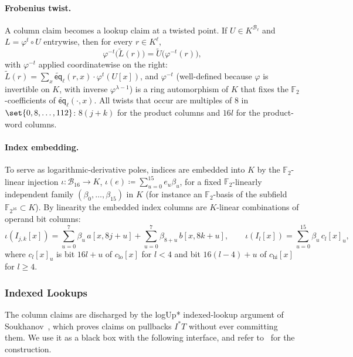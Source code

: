 \documentclass{article}
\theoremstyle{definition}
\newcommand*{\mle}{\widetilde}
\newcommand{\eq}{\mathsf{eq}}
\newcommand{\BB}{\mathcal{B}}
\newcommand{\FF}[1]{\mathbb{F}_{#1}}
\begin{document}
\paragraph{Frobenius twist.}
A column claim becomes a lookup claim at a twisted point. If $U \in K^{\BB_\ell}$ and $L = \varphi^t \circ U$ entrywise, then for every $r \in K^\ell$,
\begin{equation}
  \varphi^{-t}\bigl( \mle{L}(r) \bigr) = \mle{U}\bigl( \varphi^{-t}(r) \bigr),
  \label{eq:frobenius-twist}
\end{equation}
with $\varphi^{-t}$ applied coordinatewise on the right: $\mle{L}(r) = \sum_x \mle{\eq}_\ell(r, x) \cdot \varphi^t(U[x])$, and $\varphi^{-t}$ (well-defined because $\varphi$ is invertible on $K$, with inverse $\varphi^{\lambda - 1}$) is a ring automorphism of $K$ that fixes the $\FF{2}$-coefficients of $\mle{\eq}_\ell(\cdot, x)$. All twists that occur are multiples of $8$ in $\set{0, 8, \ldots, 112}$: $8(j + k)$ for the product columns and $16 l$ for the product-word columns.

\paragraph{Index embedding.}
To serve as logarithmic-derivative poles, indices are embedded into $K$ by the $\FF{2}$-linear injection $\iota \colon \BB_{16} \to K$, $\iota(e) \coloneqq \sum_{u = 0}^{15} e_u \beta_u$, for a fixed $\FF{2}$-linearly independent family $(\beta_0, \ldots, \beta_{15})$ in $K$ (for instance an $\FF{2}$-basis of the subfield $\FF{2^{16}} \subset K$). By linearity the embedded index columns are $K$-linear combinations of operand bit columns:
\begin{equation}
  \iota(I_{j, k}[x]) = \sum_{u = 0}^{7} \beta_u \, a[x, 8j + u] + \sum_{u = 0}^{7} \beta_{8 + u} \, b[x, 8k + u], \qquad \iota(I_l[x]) = \sum_{u = 0}^{15} \beta_u \, c_l[x]_u,
  \label{eq:index-embedding}
\end{equation}
where $c_l[x]_u$ is bit $16l + u$ of $c_\text{lo}[x]$ for $l < 4$ and bit $16(l - 4) + u$ of $c_\text{hi}[x]$ for $l \geq 4$.

\subsubsection{Indexed Lookups}
\label{sec:intmul-lookups}

The column claims are discharged by the logUp* indexed-lookup argument of Soukhanov~\cite{cryptoeprint:2025/946}, which proves claims on pullbacks $I^* T$ without ever committing them. We use it as a black box with the following interface, and refer to~\cite{cryptoeprint:2025/946} for the construction.
\end{document}
